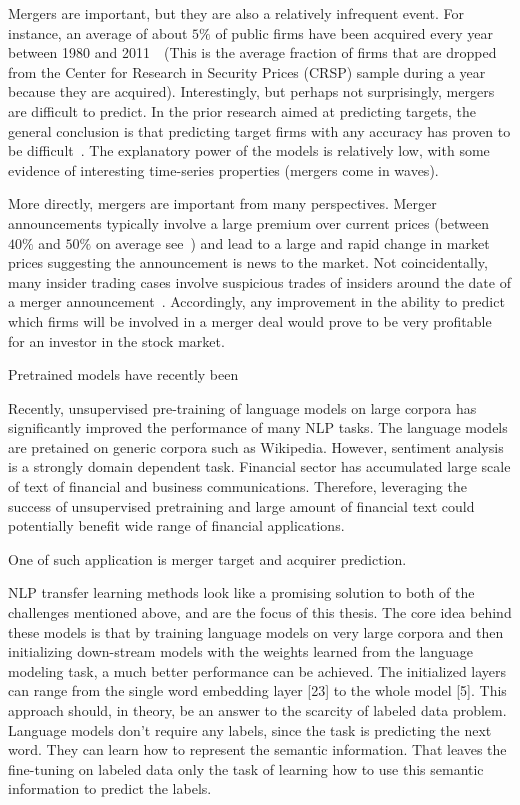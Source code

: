 \documentclass[11pt]{article}
\begin{document}
Mergers are important, but they are also a relatively infrequent
event. For instance, an average of about $5\%$ of public firms have been acquired every year between 1980
and 2011~\cite{routledge2013}~(This is the average fraction of firms that are dropped from the Center for Research in Security Prices
(CRSP) sample during a year because they are acquired). Interestingly, but perhaps not surprisingly, mergers are
difficult to predict. In the prior research aimed at predicting targets, the general conclusion is
that predicting target firms with any accuracy has proven to be
difficult~\cite{betton2008}. The explanatory power of the models is
relatively low, with some evidence of interesting time-series properties (mergers come in waves).

More directly, mergers are important from many perspectives. Merger announcements typically involve a large premium over
current prices (between $40\%$ and $50\%$ on average see~\cite{eckbo2014}) and lead to a large and
rapid change in market prices suggesting the announcement is news to
the market. Not coincidentally, many insider trading cases involve suspicious trades of insiders around the date
of a merger announcement~\cite{keown1981}. Accordingly, any improvement in the ability to predict which firms will be involved in a merger deal
would prove to be very profitable for an investor in the stock market.

Pretrained models have recently been

Recently, unsupervised pre-training of language models on large corpora has significantly improved
the performance of many NLP tasks. The language models are pretained on generic corpora
such as Wikipedia. However, sentiment analysis
is a strongly domain dependent task. Financial
sector has accumulated large scale of text of financial
and business communications. Therefore,
leveraging the success of unsupervised pretraining
and large amount of financial text could potentially
benefit wide range of financial applications.

One of such application is merger target and acquirer prediction.

NLP transfer learning methods look like a promising solution
to both of the challenges mentioned above, and are the focus of
this thesis. The core idea behind these models is that by training
language models on very large corpora and then initializing
down-stream models with the weights learned from the language
modeling task, a much better performance can be achieved. The
initialized layers can range from the single word embedding layer
[23] to the whole model [5]. This approach should, in theory, be an
answer to the scarcity of labeled data problem. Language models
don’t require any labels, since the task is predicting the next word.
They can learn how to represent the semantic information. That
leaves the fine-tuning on labeled data only the task of learning how
to use this semantic information to predict the labels.
\end{document}
